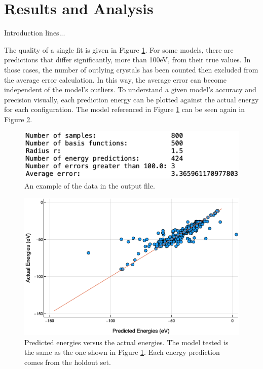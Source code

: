 \section{Results and Analysis}\label{Sect:results}
\par Introduction lines...
\par The quality of a single fit is given in Figure \ref{outputExample}. For some models, there are predictions that differ significantly, more than 100eV, from their true values. In those cases, the number of outlying crystals has been counted then excluded from the average error calculation. In this way, the average error can become independent of the model's outliers. To understand a given model's accuracy and precision visually, each prediction energy can be plotted against the actual energy for each configuration. The model referenced in Figure \ref{outputExample} can be seen again in Figure \ref{accuracyPlot}.

\begin{figure}[h]
\includegraphics[scale = 0.4]{Figures/outputExample}
\caption{An example of the data in the output file. 
\label{outputExample}} 
\end{figure}

\begin{figure}[h]
\includegraphics[scale = 0.31]{Figures/accuracyPlot}
\caption{Predicted energies versus the actual energies. The model tested is the same as the one shown in Figure \ref{outputExample}. Each energy prediction comes from the holdout set.
\label{accuracyPlot}} 
\end{figure}

